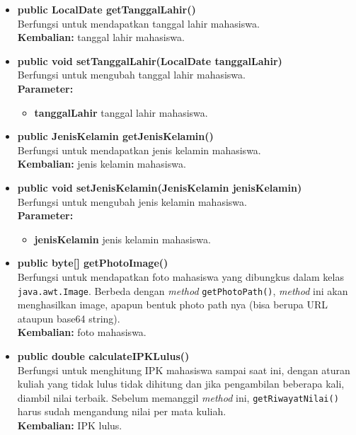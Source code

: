 \begin{itemize}
	\item \textbf{public LocalDate getTanggalLahir()}\\
	Berfungsi untuk mendapatkan tanggal lahir mahasiswa.\\
	\textbf{Kembalian:} tanggal lahir mahasiswa.
	
	\item \textbf{public void setTanggalLahir(LocalDate tanggalLahir)}\\
	Berfungsi untuk mengubah tanggal lahir mahasiswa.\\
        \textbf{Parameter:}
		\begin{itemize}
			\item \textbf{tanggalLahir} tanggal lahir mahasiswa.
		\end{itemize}
		
	\item \textbf{public JenisKelamin getJenisKelamin()}\\
	Berfungsi untuk mendapatkan jenis kelamin mahasiswa.\\
	\textbf{Kembalian:} jenis kelamin mahasiswa.
	
	\item \textbf{public void setJenisKelamin(JenisKelamin jenisKelamin)}\\
	Berfungsi untuk mengubah jenis kelamin mahasiswa.\\
        \textbf{Parameter:}
		\begin{itemize}
			\item \textbf{jenisKelamin} jenis kelamin mahasiswa.
		\end{itemize}
		
	\item \textbf{public byte[] getPhotoImage()}\\
	Berfungsi untuk mendapatkan foto mahasiswa yang dibungkus dalam kelas \texttt{java.awt.Image}. Berbeda dengan \textit{method} \texttt{getPhotoPath()}, \textit{method} ini akan menghasilkan image, apapun bentuk photo path nya (bisa berupa URL ataupun base64 string).\\
	\textbf{Kembalian:} foto mahasiswa.
		
	\item \textbf{public double calculateIPKLulus()}\\
	Berfungsi untuk menghitung IPK mahasiswa sampai saat ini, dengan aturan kuliah yang tidak lulus tidak dihitung dan jika pengambilan beberapa kali, diambil nilai terbaik. Sebelum memanggil \textit{method} ini, \texttt{getRiwayatNilai()} harus sudah mengandung nilai per mata kuliah.\\
	\textbf{Kembalian:} IPK lulus.
		

\end{itemize}
